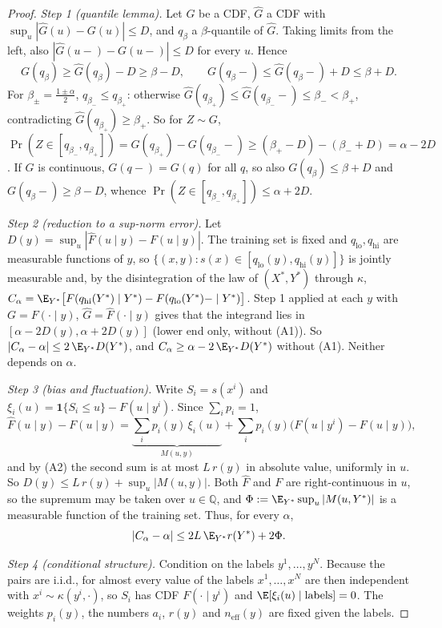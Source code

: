 \begin{proof}
\emph{Step 1 (quantile lemma).} Let $G$ be a CDF, $\widehat G$ a CDF with
$\sup_u|\widehat G(u)-G(u)|\le D$, and $q_\beta$ a $\beta$-quantile of $\widehat G$. Taking
limits from the left, also $|\widehat G(u-)-G(u-)|\le D$ for every $u$. Hence
\[
G(q_\beta)\ge\widehat G(q_\beta)-D\ge\beta-D,\qquad G(q_\beta-)\le\widehat G(q_\beta-)+D\le\beta+D .
\]
For $\beta_\pm=\frac{1\pm\alpha}2$, $q_{\beta_-}\le q_{\beta_+}$: otherwise
$\widehat G(q_{\beta_+})\le\widehat G(q_{\beta_-}-)\le\beta_-<\beta_+$, contradicting
$\widehat G(q_{\beta_+})\ge\beta_+$. So for $Z\sim G$,
$\Pr(Z\in[q_{\beta_-},q_{\beta_+}])=G(q_{\beta_+})-G(q_{\beta_-}-)\ge(\beta_+-D)-(\beta_-+D)=\alpha-2D$.
If $G$ is continuous, $G(q-)=G(q)$ for all $q$, so also $G(q_\beta)\le\beta+D$ and
$G(q_\beta-)\ge\beta-D$, whence $\Pr(Z\in[q_{\beta_-},q_{\beta_+}])\le\alpha+2D$.

\emph{Step 2 (reduction to a sup-norm error).} Let
$D(y)=\sup_u|\widehat F(u\mid y)-F(u\mid y)|$. The training set is fixed and
$q_{\mathrm{lo}},q_{\mathrm{hi}}$ are measurable functions of $y$, so
$\{(x,y):s(x)\in[q_{\mathrm{lo}}(y),q_{\mathrm{hi}}(y)]\}$ is jointly measurable and, by the
disintegration of the law of $(X^*,Y^*)$ through $\kappa$,
$C_\alpha=\E_{Y^*}\big[F(q_{\mathrm{hi}}(Y^*)\mid Y^*)-F(q_{\mathrm{lo}}(Y^*)-\mid Y^*)\big]$.
Step 1 applied at each $y$ with $G=F(\cdot\mid y)$, $\widehat G=\widehat F(\cdot\mid y)$ gives
that the integrand lies in $[\alpha-2D(y),\alpha+2D(y)]$ (lower end only, without (A1)).
So $|C_\alpha-\alpha|\le2\,\E_{Y^*}D(Y^*)$, and $C_\alpha\ge\alpha-2\,\E_{Y^*}D(Y^*)$ without
(A1). Neither depends on $\alpha$.

\emph{Step 3 (bias and fluctuation).} Write $S_i=s(x^i)$ and
$\xi_i(u)=\mathbf 1\{S_i\le u\}-F(u\mid y^i)$. Since $\sum_ip_i=1$,
\[
\widehat F(u\mid y)-F(u\mid y)=\underbrace{\sum_ip_i(y)\,\xi_i(u)}_{M(u,y)}
+\sum_ip_i(y)\big(F(u\mid y^i)-F(u\mid y)\big),
\]
and by (A2) the second sum is at most $L\,r(y)$ in absolute value, uniformly in $u$. So
$D(y)\le L\,r(y)+\sup_u|M(u,y)|$. Both $\widehat F$ and $F$ are right-continuous in $u$, so
the supremum may be taken over $u\in\mathbb Q$, and $\Phi:=\E_{Y^*}\sup_u|M(u,Y^*)|$ is a
measurable function of the training set. Thus, for every $\alpha$,
\[
|C_\alpha-\alpha|\le2L\,\E_{Y^*}r(Y^*)+2\Phi .
\]

\emph{Step 4 (conditional structure).} Condition on the labels $y^1,\dots,y^N$. Because the
pairs are i.i.d., for almost every value of the labels $x^1,\dots,x^N$ are then independent
with $x^i\sim\kappa(y^i,\cdot)$, so $S_i$ has CDF $F(\cdot\mid y^i)$ and
$\E[\xi_i(u)\mid\text{labels}]=0$. The weights $p_i(y)$, the numbers $a_i$, $r(y)$ and
$n_{\mathrm{eff}}(y)$ are fixed given the labels.


\end{proof}
